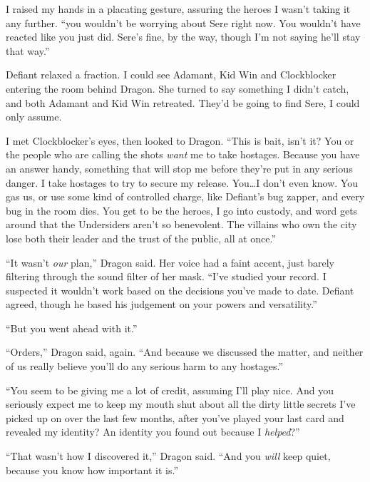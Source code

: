 I raised my hands in a placating gesture, assuring the heroes I wasn't taking it any further. ``\ldotsor you wouldn't be worrying about Sere right now.  You wouldn't have reacted like you just did.  Sere's fine, by the way, though I'm not saying he'll stay that way.''



Defiant relaxed a fraction.  I could see Adamant, Kid Win and Clockblocker entering the room behind Dragon.  She turned to say something I didn't catch, and both Adamant and Kid Win retreated.  They'd be going to find Sere, I could only assume.



I met Clockblocker's eyes, then looked to Dragon.  ``This is bait, isn't it?  You or the people who are calling the shots \emph{want} me to take hostages.  Because you have an answer handy, something that will stop me before they're put in any serious danger.  I take hostages to try to secure my release.  You\ldots I don't even know.  You gas us, or use some kind of controlled charge, like Defiant's bug zapper, and every bug in the room dies.  You get to be the heroes, I go into custody, and word gets around that the Undersiders aren't so benevolent.  The villains who own the city lose both their leader and the trust of the public, all at once.''



``It wasn't \emph{our} plan,'' Dragon said.  Her voice had a faint accent, just barely filtering through the sound filter of her mask.  ``I've studied your record.  I suspected it wouldn't work based on the decisions you've made to date.  Defiant agreed, though he based his judgement on your powers and versatility.''



``But you went ahead with it.''



``Orders,'' Dragon said, again.  ``And because we discussed the matter, and neither of us really believe you'll do any serious harm to any hostages.''



``You seem to be giving me a lot of credit, assuming I'll play nice.  And you seriously expect me to keep my mouth shut about all the dirty little secrets I've picked up on over the last few months, after you've played your last card and revealed my identity?  An identity you found out because I \emph{helped}?''



``That wasn't how I discovered it,'' Dragon said.  ``And you \emph{will} keep quiet, because you know how important it is.''



